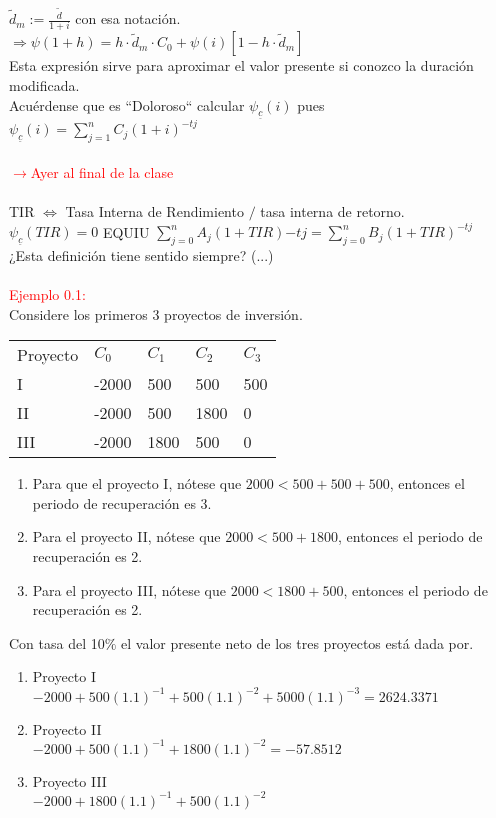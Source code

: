 \phantom{abc}\phantom{abc}\phantom{a}$\tilde{d}_m:= \frac{\tilde{d}}{1+i}$ con esa notación.\\
\phantom{abc}\phantom{abc}\phantom{a} $\Rightarrow \psi (1+h) = h\cdot \tilde{d}_m \cdot C_0 + \psi(i)[1-h\cdot\tilde{d}_m]$\\
\phantom{abc}\phantom{abc}\phantom{a} Esta expresión sirve para aproximar el valor presente si conozco la duración modificada.\\
\phantom{abc}\phantom{abc}\phantom{a} Acuérdense que es ``Doloroso`` calcular $\psi_{\underline{c}}(i)$ pues $\psi_{\underline{c}}(i) = \sum_{j=1}^{n}C_j(1+i)^{-tj}$ \\ \\ 
\textcolor{red}{$\rightarrow$Ayer al final de la clase}\\ \\
TIR $\Leftrightarrow$ Tasa Interna de Rendimiento $\big/$ tasa interna de retorno.\\
$\psi_{\underline{c}}(TIR) = 0$ \phantom{abc} EQUIU $\sum_{j=0}^{n}A_j(1+TIR){-tj} = \sum_{j=0}^{n}B_j(1+TIR)^{-tj}$\\
¿Esta definición tiene sentido siempre? (...)\\ \\
\textcolor{red}{Ejemplo 0.1:}\\
Considere los primeros 3 proyectos de inversión.
\begin{table}[h]
\centering
\begin{tabular}{lllll}
Proyecto & $C_0$ & $C_1$ & $C_2$ & $C_3$ \\
I        & -2000 & 500   & 500   & 500   \\
II       & -2000 & 500   & 1800  & 0     \\
III      & -2000 & 1800  & 500   & 0    
\end{tabular}
\end{table}
\begin{enumerate}
    \item Para que el proyecto I, nótese que $2000<500+500+500$, entonces el periodo de recuperación es 3.
\item Para el proyecto II, nótese que $2000<500+1800$, entonces el periodo de recuperación es 2.
\item Para el proyecto III, nótese que $2000<1800+500$, entonces el periodo de recuperación es 2.
\end{enumerate}
Con tasa del 10$\%$ el valor presente neto de los tres proyectos está dada por. 
\begin{enumerate}
    \item Proyecto I \\
    $-2000+500(1.1)^{-1} + 500(1.1)^{-2} +5000(1.1)^{-3} = 2624.3371$
\item Proyecto II \\
$-2000+500(1.1)^{-1}+1800(1.1)^{-2}=-57.8512$
\item Proyecto III \\
$-2000+1800(1.1)^{-1}+500(1.1)^{-2}$
\end{enumerate}
